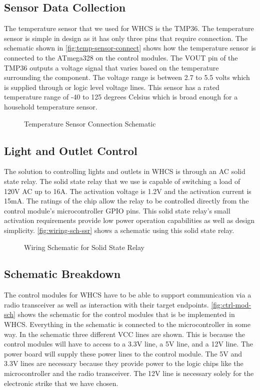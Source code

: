 \documentclass[draft,twocolumn,letterpaper,10pt]{IEEEtran}
\newcommand{\ucffig}[3]{
\begin{figure}[h]
\centering
\makebox[\linewidth][c]{
#2
}
\caption{#3}
\label{#1}
\end{figure}
}
\newcommand{\ucfgfx}[4][scale=1.0]{
\ucffig{#2}{\texttt{[image: \#3]}}{#4}
}
\begin{document}
\subsection{Sensor Data Collection}
The temperature sensor that we used for WHCS is the TMP36. The temperature
sensor is simple in design as it has only three pins that require connection.
The schematic shown in \autoref{fig:temp-sensor-connect} shows how the
temperature sensor is connected to the ATmega328 on the control modules. The
VOUT pin of the TMP36 outputs a voltage signal that varies based on the
temperature surrounding the component.  The voltage range is between 2.7 to 5.5
volts which is supplied through or logic level voltage lines. This sensor has a
rated temperature range of -40 to 125 degrees Celsius which is broad enough for
a household temperature sensor.

\ucfgfx[width=\linewidth]{fig:temp-sensor-connect}
{a683SensorCollectionexpected2pages-img001.png}{Temperature Sensor Connection Schematic}

\subsection{Light and Outlet Control}
The solution to controlling lights and outlets in WHCS is through an AC solid
state relay. The solid state relay that we use is capable of switching a load
of 120V AC up to 16A. The activation voltage is 1.2V and the activation current
is 15mA. The ratings of the chip allow the relay to be controlled directly from
the control module’s microcontroller GPIO pins. This solid state relay’s small
activation requirements provide low power operation capabilities as well as
design simplicity. \autoref{fig:wiring-sch-ssr} shows a schematic using this
solid state relay.

\ucfgfx[width=\linewidth]{fig:wiring-sch-ssr}{a684LightandOutletControl-img001.png}{
Wiring Schematic for Solid State Relay}

\subsection{Schematic Breakdown}
The control modules for WHCS have to be able to support communication via a
radio transceiver as well as interaction with their target endpoints.
\autoref{fig:ctrl-mod-sch} shows the schematic for the control modules that is be
implemented in WHCS.
Everything in the schematic is connected to the microcontroller in some way. In
the schematic three different VCC lines are shown. This is because the control
modules will have to access to a 3.3V line, a 5V line, and a 12V line. The
power board will supply these power lines to the control module. The 5V and
3.3V lines are necessary because they provide power to the logic chips like the
microcontroller and the radio transceiver. The 12V line is necessary solely for
the electronic strike that we have chosen.
\end{document}
